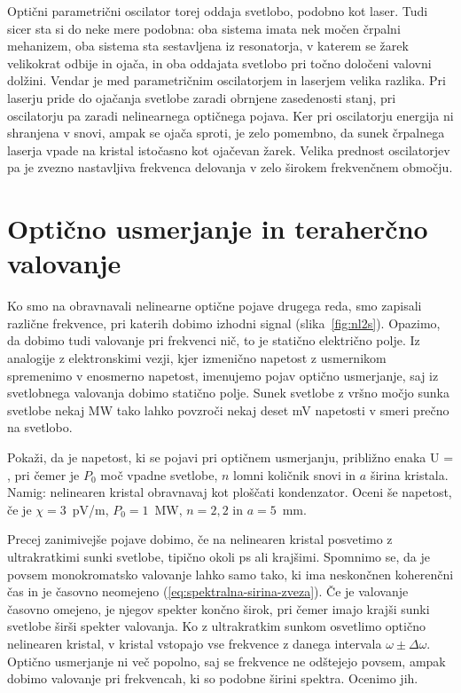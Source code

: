 \begin{remark}
Optični parametrični oscilator torej oddaja svetlobo, podobno kot laser. Tudi sicer
sta si do neke mere podobna: oba sistema imata nek močen črpalni mehanizem, oba sistema
sta sestavljena iz resonatorja, v katerem se žarek velikokrat odbije in ojača, in oba
oddajata svetlobo pri točno določeni valovni dolžini. Vendar
je med parametričnim oscilatorjem in laserjem velika razlika. Pri laserju pride do
ojačanja svetlobe zaradi obrnjene zasedenosti stanj, pri oscilatorju pa 
zaradi nelinearnega optičnega pojava. Ker pri oscilatorju energija ni shranjena v
snovi, ampak se ojača sproti, je zelo pomembno, da sunek črpalnega laserja vpade
na kristal istočasno kot ojačevan žarek. Velika prednost oscilatorjev pa je zvezno 
nastavljiva frekvenca delovanja v zelo širokem frekvenčnem območju.  
\end{remark}

\section{Optično usmerjanje in teraherčno valovanje}
Ko smo na obravnavali nelinearne optične pojave drugega reda, smo zapisali
različne frekvence, pri katerih dobimo izhodni signal (slika~\ref{fig:nl2s}). Opazimo, 
da dobimo tudi valovanje pri frekvenci nič, to je statično električno polje. Iz analogije
z elektronskimi vezji, kjer izmenično napetost z usmernikom spremenimo v enosmerno napetost, 
imenujemo pojav optično usmerjanje, saj iz svetlobnega valovanja dobimo statično polje.
Sunek svetlobe z vršno močjo sunka svetlobe nekaj MW tako lahko povzroči 
nekaj deset mV napetosti v smeri prečno na svetlobo. 

\begin{definition}
Pokaži, da je napetost, ki se pojavi pri optičnem usmerjanju, približno enaka
\beq
U = ,
\eeq
pri čemer je $P_0$ moč vpadne svetlobe, $n$ lomni količnik snovi in $a$ širina kristala.
Namig: nelinearen kristal obravnavaj kot ploščati kondenzator. Oceni še napetost, če je
$\chi = 3$~pV/m, $P_0 = 1$~MW, $n = 2,2$ in $a = 5$~mm. 
\end{definition}

Precej zanimivejše pojave dobimo, če na nelinearen kristal posvetimo z ultrakratkimi 
sunki svetlobe, tipično okoli ps ali krajšimi. Spomnimo se, da je povsem monokromatsko valovanje
lahko samo tako, ki ima neskončnen koherenčni čas in je časovno neomejeno 
(\ref{eq:spektralna-sirina-zveza}). 
Če je valovanje časovno omejeno, je njegov spekter končno širok, pri čemer imajo krajši 
sunki svetlobe širši spekter valovanja. Ko z ultrakratkim sunkom osvetlimo optično 
nelinearen kristal, v kristal vstopajo vse frekvence z danega intervala $\omega \pm \Delta \omega$.
Optično usmerjanje ni več popolno, saj se frekvence ne odštejejo povsem, ampak dobimo 
valovanje pri frekvencah, ki so podobne širini spektra. Ocenimo jih. 

